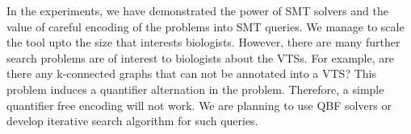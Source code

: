 In the experiments, we have demonstrated the power of SMT solvers and the value
of careful encoding of the problems into SMT queries.
%
We manage to scale the tool upto the size that interests biologists.
%
However, there are many further search problems are of interest to
biologists about the VTSs.
%
For example, are there any k-connected graphs that can not be
annotated into a VTS?
%
This problem induces a quantifier alternation in the problem.
%
Therefore, a simple quantifier free encoding will not work.
%
We are planning to use QBF solvers or develop
iterative search algorithm for such queries.
%





